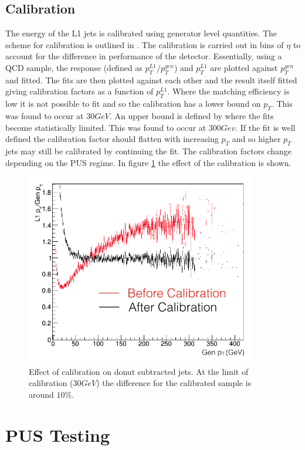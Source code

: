 \subsection{Calibration}
The energy of the L1 jets is calibrated using generator level quantities. The scheme for calibration is outlined in \cite{l1jet_calibration}. The calibration is carried out in bins of $\eta$ to account for the difference in performance of the detector. Essentially, using a QCD sample, the response (defined as $p^{L1}_{T}/p^{gen}_{T}$) and $p^{L1}_{T}$ are plotted against $p^{gen}_{T}$ and fitted. The fits are then plotted against each other and the result itself fitted giving calibration factors as a function of $p^{L1}_{T}$.  Where the matching efficiency is low it is not possible to fit and so the calibration has a lower bound on $p_T$. This was found to occur at $30GeV$. An upper bound is defined by where the fits become statistically limited. This was found to occur at $300Gev$. If the fit is well defined the calibration factor should flatten with increasing $p_T$ and so higher $p_T$ jets may still be calibrated by continuing the fit. The calibration factors change depending on the PUS regime. In figure \ref{calib} the effect of the calibration is shown.   

\begin{figure}
\centering
    \includegraphics[width=0.9\textwidth]{./Figures/calibration}
  \caption{Effect of calibration on donut subtracted jets. At the limit of calibration ($30GeV$) the difference for the calibrated sample is around $10\%$.}
  \label{calib}
\end{figure}
\section{PUS Testing}

